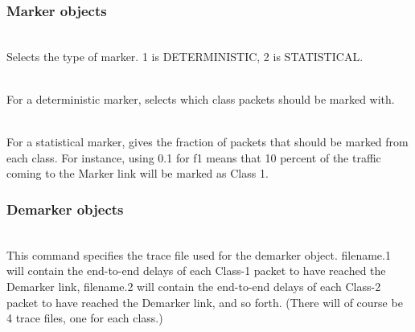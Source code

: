 \subsubsection{Marker objects}
\\
Selects the type of marker. 1 is DETERMINISTIC, 2 is STATISTICAL. 

\\
For a deterministic marker, selects which class packets should be marked with.

\\
For a statistical marker, gives the fraction of packets that should be marked 
from each class. For instance, using 0.1 for f1 means that 10 percent of the 
traffic coming to the Marker link will be marked as Class 1.

\subsubsection{Demarker objects}
\\
This command specifies the trace file used for the demarker object. 
filename.1 will contain the end-to-end 
delays of each Class-1 packet to have reached the 
Demarker link, filename.2 will contain the end-to-end 
delays of each Class-2 packet to have reached the 
Demarker link, and so forth. (There will of course be 4 trace files, one 
for each class.)

\endinput

### Local Variables:
### mode: latex
### comment-column: 60
### backup-by-copying-when-linked: t
### file-precious-flag: nil
### End:
